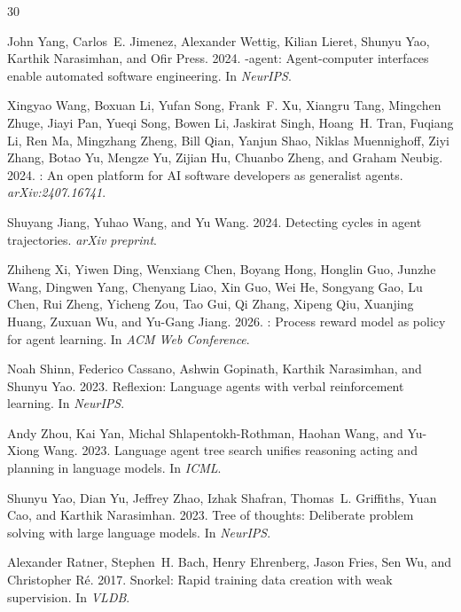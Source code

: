 \documentclass[11pt,a4paper]{article}
\begin{document}
\begin{thebibliography}{30}

John Yang, Carlos~E. Jimenez, Alexander Wettig, Kilian Lieret, Shunyu Yao, Karthik Narasimhan, and Ofir Press. 2024.
-agent: Agent-computer interfaces enable automated software engineering.
\newblock In \emph{NeurIPS}.

Xingyao Wang, Boxuan Li, Yufan Song, Frank~F. Xu, Xiangru Tang, Mingchen Zhuge, Jiayi Pan, Yueqi Song, Bowen Li, Jaskirat Singh, Hoang~H. Tran, Fuqiang Li, Ren Ma, Mingzhang Zheng, Bill Qian, Yanjun Shao, Niklas Muennighoff, Ziyi Zhang, Botao Yu, Mengze Yu, Zijian Hu, Chuanbo Zheng, and Graham Neubig. 2024.
: An open platform for {AI} software developers as generalist agents.
\newblock \emph{arXiv:2407.16741}.

Shuyang Jiang, Yuhao Wang, and Yu Wang. 2024.
\newblock Detecting cycles in agent trajectories.
\newblock \emph{arXiv preprint}.

Zhiheng Xi, Yiwen Ding, Wenxiang Chen, Boyang Hong, Honglin Guo, Junzhe Wang, Dingwen Yang, Chenyang Liao, Xin Guo, Wei He, Songyang Gao, Lu Chen, Rui Zheng, Yicheng Zou, Tao Gui, Qi Zhang, Xipeng Qiu, Xuanjing Huang, Zuxuan Wu, and Yu-Gang Jiang. 2026.
: Process reward model as policy for agent learning.
\newblock In \emph{ACM Web Conference}.

Noah Shinn, Federico Cassano, Ashwin Gopinath, Karthik Narasimhan, and Shunyu Yao. 2023.
\newblock Reflexion: Language agents with verbal reinforcement learning.
\newblock In \emph{NeurIPS}.

Andy Zhou, Kai Yan, Michal Shlapentokh-Rothman, Haohan Wang, and Yu-Xiong Wang. 2023.
\newblock Language agent tree search unifies reasoning acting and planning in language models.
\newblock In \emph{ICML}.

Shunyu Yao, Dian Yu, Jeffrey Zhao, Izhak Shafran, Thomas~L. Griffiths, Yuan Cao, and Karthik Narasimhan. 2023.
\newblock Tree of thoughts: Deliberate problem solving with large language models.
\newblock In \emph{NeurIPS}.

Alexander Ratner, Stephen~H. Bach, Henry Ehrenberg, Jason Fries, Sen Wu, and Christopher R{\'e}. 2017.
\newblock Snorkel: Rapid training data creation with weak supervision.
\newblock In \emph{VLDB}.


\end{thebibliography}
\end{document}
